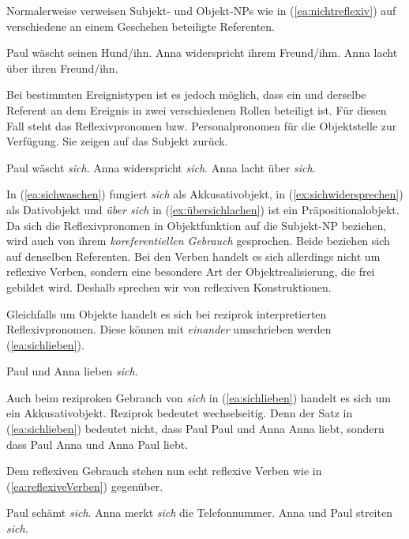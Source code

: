 Normalerweise verweisen Subjekt- und Objekt-NPs wie in (\ref{ea:nichtreflexiv}) auf verschiedene an einem Geschehen beteiligte Referenten. 

\ea \label{ea:nichtreflexiv}
\ea \label{ea:waschen} Paul wäscht seinen Hund/ihn.   
\ex \label{ex:widersprechen} Anna widerspricht ihrem Freund/ihm.
\ex \label{ex:lachen} Anna lacht über ihren Freund/ihn. 
\z 
\z 

Bei bestimmten Ereignistypen ist es jedoch möglich, dass ein und derselbe Referent an dem Ereignis in zwei verschiedenen Rollen beteiligt ist. Für diesen Fall steht das Reflexivpronomen bzw. Personalpronomen für die Objektstelle zur Verfügung. Sie zeigen auf das Subjekt zurück.

\largerpage[2]
\ea \label{ea:ReflexivKonstruktion}
\ea \label{ea:sichwaschen} Paul wäscht \textit{sich}.    
\ex \label{ex:sichwidersprechen} Anna widerspricht \textit{sich}. 
\ex \label{ex:übersichlachen} Anna lacht über \textit{sich}.
\z 
\z 

In (\ref{ea:sichwaschen}) fungiert \textit{sich} als Akkusativobjekt, in (\ref{ex:sichwidersprechen}) als Dativobjekt und \textit{über sich} in (\ref{ex:übersichlachen}) ist ein Präpositionalobjekt. Da sich die Reflexivpronomen in Objektfunktion auf die Subjekt-NP beziehen, wird auch von ihrem \textit{koreferentiellen Gebrauch} gesprochen. Beide beziehen sich auf denselben Referenten. Bei den Verben handelt es sich allerdings nicht um reflexive Verben, sondern eine besondere Art der Objektrealisierung, die frei gebildet wird. Deshalb sprechen wir von reflexiven Konstruktionen.

Gleichfalls um Objekte handelt es sich bei reziprok interpretierten Reflexivpronomen. Diese können mit \textit{einander} umschrieben werden (\ref{ea:sichlieben}).

\ea \label{ea:sichlieben} Paul und Anna lieben \textit{sich}. 
\z

Auch beim reziproken Gebrauch von \textit{sich} in (\ref{ea:sichlieben}) handelt es sich um ein Akkusativobjekt. Reziprok bedeutet wechselseitig. Denn der Satz in (\ref{ea:sichlieben}) bedeutet nicht, dass Paul Paul und Anna Anna liebt, sondern dass Paul Anna und Anna Paul liebt.  

Dem reflexiven Gebrauch stehen nun echt reflexive Verben wie in (\ref{ea:reflexiveVerben}) gegenüber.

\ea \label{ea:reflexiveVerben}
\ea \label{ea:sichschämen} Paul schämt \textit{sich}.   
\ex \label{ex:sichmerken} Anna merkt \textit{sich} die Telefonnummer.
\ex \label{ex:sichstreiten} Anna und Paul streiten \textit{sich}. 
\z 
\z 

